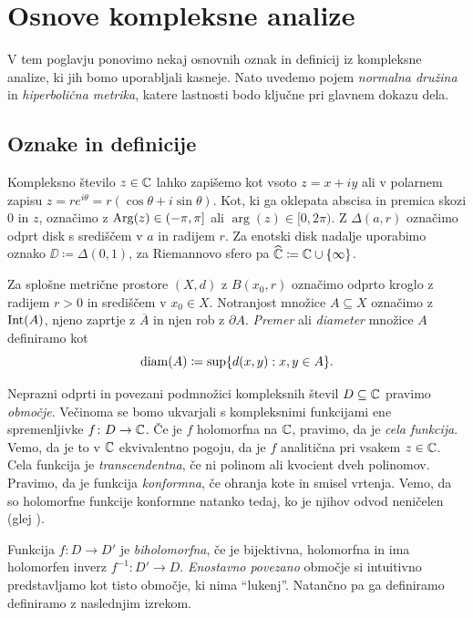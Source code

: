 \section{Osnove kompleksne analize} \label{sec:hipgeom}

V tem poglavju ponovimo nekaj osnovnih oznak in definicij iz kompleksne analize, ki jih bomo uporabljali kasneje. Nato uvedemo pojem \emph{normalna družina} in \emph{hiperbolična metrika}, katere lastnosti bodo ključne pri glavnem dokazu dela.

\subsection{Oznake in definicije}

Kompleksno število \(z \in \mathbb C\) lahko zapišemo kot vsoto \(z = x + i y\) ali v polarnem zapisu \(z = r e^{i \theta} = r (\cos \theta + i \sin \theta)\). Kot, ki ga oklepata abscisa in premica skozi \(0\) in \(z\), označimo z \(\operatorname{Arg} (z) \in (- \pi, \pi]\) ali \(\arg (z) \in [0, 2 \pi)\). Z \(\Delta (a, r)\) označimo odprt disk s središčem v \(a\) in radijem \(r\). Za enotski disk nadalje uporabimo oznako \(\DD \coloneq \Delta (0, 1)\), za Riemannovo sfero pa \(\widehat{\mathbb C} \coloneq \mathbb C \cup \{\infty\}\).

Za splošne metrične prostore \((X, d)\) z \(B (x_0, r)\) označimo odprto kroglo z radijem \(r > 0\) in središčem v \(x_0 \in X\). Notranjost množice \(A \subseteq X\) označimo z \(\operatorname{Int} (A)\), njeno zaprtje z \(\overline{A}\) in njen rob z \(\partial A\). \emph{Premer} ali \emph{diameter} množice \(A\) definiramo kot
\[\operatorname{diam} (A) \coloneq \sup \{d (x, y) : x, y \in A\}.\]

Neprazni odprti in povezani podmnožici kompleksnih števil \(D \subseteq \mathbb C\) pravimo \emph{območje}. Večinoma se bomo ukvarjali s kompleksnimi funkcijami ene spremenljivke \(f \colon D \to \mathbb C\). Če je \(f\) holomorfna na \(\mathbb C\), pravimo, da je \emph{cela funkcija}. Vemo, da je to v \(\mathbb C\) ekvivalentno pogoju, da je \(f\) analitična pri vsakem \(z \in \mathbb C\). Cela funkcija je \emph{transcendentna}, če ni polinom ali kvocient dveh polinomov. Pravimo, da je funkcija \emph{konformna}, če ohranja kote in smisel vrtenja. Vemo, da so holomorfne funkcije konformne natanko tedaj, ko je njihov odvod neničelen (glej \cite[izrek 78]{Globevnik_2010}).

Funkcija \(f \colon D \to D'\) je \emph{biholomorfna}, če je bijektivna, holomorfna in ima holomorfen inverz \(f^{-1} \colon D' \to D\). \emph{Enostavno povezano} območje si intuitivno predstavljamo kot tisto območje, ki nima ``lukenj''. Natančno pa ga definiramo definiramo z naslednjim izrekom.

